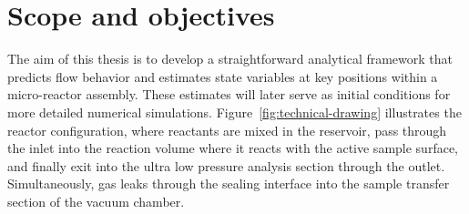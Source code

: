 \section{Scope and objectives}\label{sec:scope-objectives}
	The aim of this thesis is to develop a straightforward analytical framework that predicts flow behavior and estimates state variables at key positions within a micro-reactor assembly.
	These estimates will later serve as initial conditions for more detailed numerical simulations.
	Figure \ref{fig:technical-drawing} illustrates the reactor configuration, where reactants are mixed in the reservoir, pass through the inlet into the reaction volume where it reacts with the active sample surface, and finally exit into the ultra low pressure analysis section through the outlet.
	Simultaneously, gas leaks through the sealing interface into the sample transfer section of the vacuum chamber.

